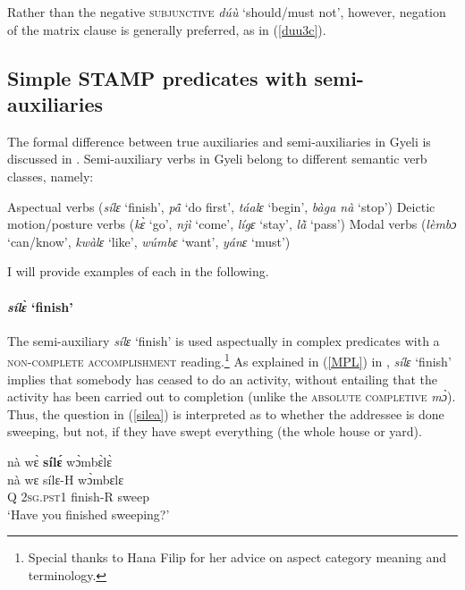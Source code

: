 \noindent Rather than the negative \textsc{subjunctive} {\itshape dúù} `should/must not', however, negation of the matrix clause is generally preferred, as in (\ref{duu3c}).










\subsection{Simple STAMP predicates with semi-auxiliaries}
\label {sec:ComplSemi}

 The formal difference between true auxiliaries and semi-auxiliaries in Gyeli is discussed in . Semi-auxiliary verbs in Gyeli belong to different semantic verb classes, namely:
\begin{enumerate}
\itshapeem Aspectual verbs ({\itshape sílɛ} `finish', {\itshape pã̂} `do first', {\itshape táalɛ} `begin', {\itshape bàga nà} `stop')
\itshapeem Deictic motion/posture verbs ({\itshape kɛ̀} `go', {\itshape njì} `come', {\itshape lígɛ} `stay', {\itshape lã̀} `pass')
\itshapeem Modal verbs ({\itshape lèmbɔ} `can/know', {\itshape kwàlɛ} `like', {\itshape wúmbɛ} `want', {\itshape yánɛ} `must')
\end{enumerate}
I will provide examples of each in the following.



\paragraph{{\itshape sílɛ̀} `finish'}

The semi-auxiliary {\itshape sílɛ} `finish' is used aspectually in complex predicates with a \textsc{non-complete accomplishment} reading.\footnote{Special thanks to Hana Filip for her advice on aspect category meaning and terminology.} As explained in (\ref{MPL}) in , {\itshape sílɛ} `finish' implies that somebody has ceased to do an activity, without entailing that the activity has been carried out to completion (unlike the \textsc{absolute completive} {\itshape mɔ̀}). Thus, the question in (\ref{silea}) is interpreted as to whether the addressee is done sweeping, but not, if they have swept everything (the whole house or yard).

\begin{exe} 
\ex\label{silea}
  \glll     nà wɛ̀ {\bfseries sílɛ́} wɔ̀mbɛ̀lɛ̀\\
           nà wɛ sílɛ-H wɔ̀mbɛlɛ \\
           Q 2\textsc{sg}.\textsc{pst}1 finish-R sweep  \\
    \trans `Have you finished sweeping?'
\end{exe}


